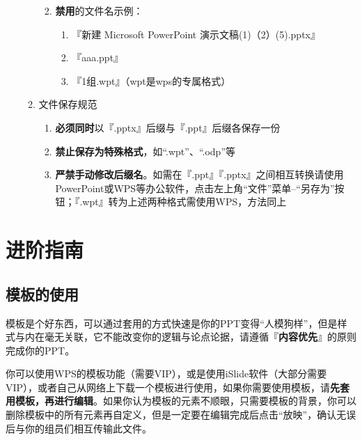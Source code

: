 \begin{enumerate}
\begin{enumerate}
\begin{enumerate}
\begin{enumerate}
                              \end{enumerate}
                        \item \textbf{禁用}的文件名示例：
                              \begin{enumerate}
                                  \item 『新建 Microsoft PowerPoint 演示文稿(1)（2）(5).pptx』
                                  \item 『aaa.ppt』
                                  \item 『1组.wpt』（wpt是wps的专属格式）
                              \end{enumerate}
                    \end{enumerate}
              \item 文件保存规范
                    \begin{enumerate}
                        \item \textbf{必须同时}以『.pptx』后缀与『.ppt』后缀各保存一份
                        \item \textbf{禁止保存为特殊格式}，如“.wpt”、“.odp”等
                        \item \textbf{严禁手动修改后缀名}。如需在『.ppt』『.pptx』之间相互转换请使用PowerPoint或WPS等办公软件，点击左上角“文件”菜单--“另存为”按钮；『.wpt』转为上述两种格式需使用WPS，方法同上
                    \end{enumerate}
          \end{enumerate}
\end{enumerate}

\section[进阶指南]{进阶指南}
\subsection[模板的使用]{模板的使用}
模板是个好东西，可以通过套用的方式快速是你的PPT变得“人模狗样”，但是样式与内在毫无关联，它不能改变你的逻辑与论点论据，请遵循『\textbf{内容优先}』的原则完成你的PPT。

你可以使用WPS的模板功能（需要VIP），或是使用iSlide软件（大部分需要VIP），或者自己从网络上下载一个模板进行使用，如果你需要使用模板，请\textbf{先套用模板，再进行编辑}。如果你认为模板的元素不顺眼，只需要模板的背景，你可以删除模板中的所有元素再自定义，但是一定要在编辑完成后点击“放映”，确认无误后与你的组员们相互传输此文件。

